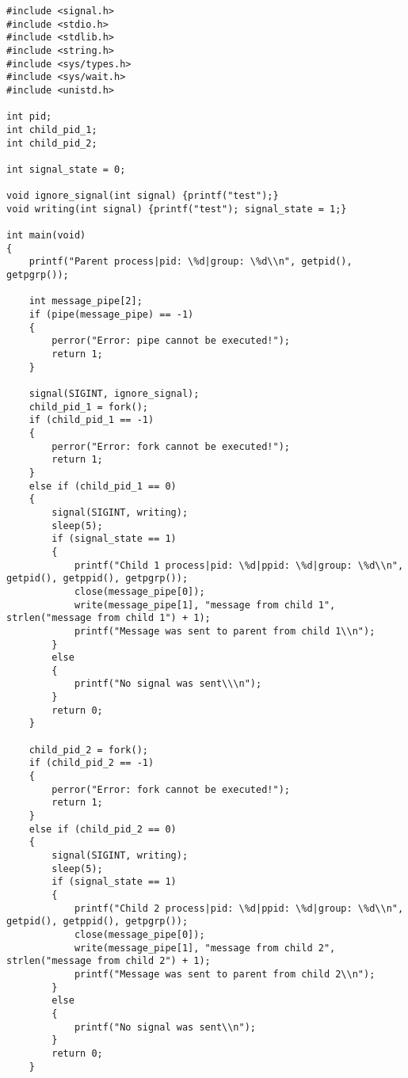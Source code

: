 \begin{lstlisting}[label=task_5,caption=Код к заданию №5]
#include <signal.h>
#include <stdio.h>
#include <stdlib.h>
#include <string.h>
#include <sys/types.h>
#include <sys/wait.h>
#include <unistd.h>

int pid;
int child_pid_1;
int child_pid_2;

int signal_state = 0;

void ignore_signal(int signal) {printf("test");}
void writing(int signal) {printf("test"); signal_state = 1;}

int main(void)
{
    printf("Parent process|pid: \%d|group: \%d\\n", getpid(), getpgrp());

    int message_pipe[2];
    if (pipe(message_pipe) == -1)
    {
        perror("Error: pipe cannot be executed!");
        return 1;
    }

    signal(SIGINT, ignore_signal);
    child_pid_1 = fork();
    if (child_pid_1 == -1)
    {
        perror("Error: fork cannot be executed!");
        return 1;
    }
    else if (child_pid_1 == 0)
    {
        signal(SIGINT, writing);
        sleep(5);
        if (signal_state == 1)
        {
            printf("Child 1 process|pid: \%d|ppid: \%d|group: \%d\\n", getpid(), getppid(), getpgrp());
            close(message_pipe[0]);
            write(message_pipe[1], "message from child 1", strlen("message from child 1") + 1);
            printf("Message was sent to parent from child 1\\n");
        }
        else
        {
            printf("No signal was sent\\\n");
        }
        return 0;
    }

    child_pid_2 = fork();
    if (child_pid_2 == -1)
    {
        perror("Error: fork cannot be executed!");
        return 1;
    }
    else if (child_pid_2 == 0)
    {
        signal(SIGINT, writing);
        sleep(5);
        if (signal_state == 1)
        {
            printf("Child 2 process|pid: \%d|ppid: \%d|group: \%d\\n", getpid(), getppid(), getpgrp());
            close(message_pipe[0]);
            write(message_pipe[1], "message from child 2", strlen("message from child 2") + 1);
            printf("Message was sent to parent from child 2\\n");
        }
        else
        {
            printf("No signal was sent\\n");
        }
        return 0;
    }


\end{lstlisting}
